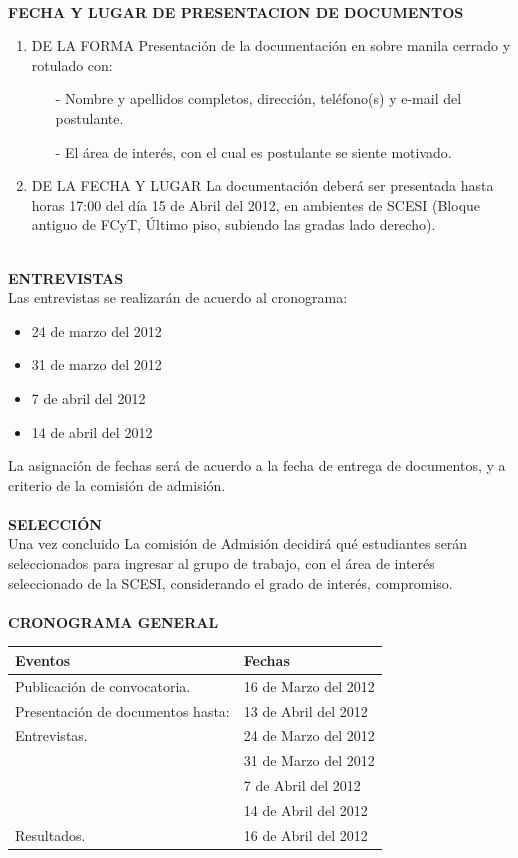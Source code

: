 \documentclass[11pt,letterpaper]{article}
\begin{document}
~\\
{\bf \small FECHA Y LUGAR DE PRESENTACION DE DOCUMENTOS}
\begin{enumerate}
\item DE LA FORMA
Presentación de la documentación en sobre manila cerrado y rotulado con:
\begin{itemize}
\item[-] Nombre y apellidos completos, dirección, teléfono(s) y e-mail del postulante.
\item[-] El área de interés, con el cual es postulante se siente motivado.
\end{itemize}
\item DE LA FECHA Y LUGAR
La documentación deberá ser presentada hasta horas 17:00 del día 15 de Abril del 2012, en ambientes de SCESI (Bloque antiguo de FCyT, Último piso, subiendo las gradas lado derecho).
\end{enumerate}
~\\
{\bf \small ENTREVISTAS}\\

Las entrevistas se realizarán de acuerdo al cronograma:
\begin{itemize}
\item 24 de marzo del 2012
\item 31 de marzo del 2012
\item 7 de abril del 2012
\item 14 de abril del 2012
\end{itemize}
La asignación de fechas será de acuerdo a la fecha de entrega de documentos, y a criterio de la comisión de admisión.\\
~\\
{\bf \small SELECCIÓN}\\

Una vez concluido La comisión de Admisión decidirá qué estudiantes serán seleccionados para ingresar al grupo de trabajo, con el área de interés seleccionado de la SCESI, considerando el grado de interés, compromiso.\\
~\\
{\bf \small CRONOGRAMA GENERAL}
\begin{center}
\begin{tabular}{|l|l|}
\hline
Eventos & Fechas\\
\hline
Publicación de convocatoria. & 16 de Marzo del 2012\\
\hline
Presentación de documentos hasta: & 13 de Abril del 2012\\
\hline
Entrevistas. & 24 de Marzo del 2012 \\
\hline
& 31 de Marzo del 2012\\
\hline
& 7 de Abril del 2012\\
\hline
& 14 de Abril del 2012\\
\hline
Resultados. & 16 de Abril del 2012\\
\hline
\end{tabular}
\end{center}
 \vspace{2cm}
\end{document}
